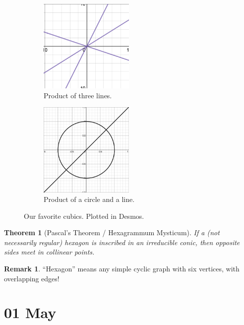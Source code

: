 \documentclass[12pt]{article}
\newtheorem{theorem}{Theorem}[section]
\theoremstyle{definition}
\newtheorem*{remark}{Remark}
\begin{document}
\begin{figure}[H]
    \vspace{1 cm}
    \begin{subfigure}{0.5\textwidth}
        \centering
        \includegraphics[width=0.5\textwidth]{44.png}
        \caption{Product of three lines.}
        \label{fig:subim2}
    \end{subfigure}
    \hfill
    \begin{subfigure}{0.5\textwidth}
        \centering
        \includegraphics[width=0.5\textwidth]{45.png}
        \caption{Product of a circle and a line.}
        \label{fig:subim2}
    \end{subfigure}

    \caption{Our favorite cubics. Plotted in Desmos.}
\end{figure}
\begin{theorem}[Pascal's Theorem / Hexagrammum Mysticum]
    If a (not necessarily regular) hexagon is inscribed in an irreducible conic, then opposite sides meet in collinear points.
\end{theorem}
\begin{remark}
   ``Hexagon'' means any simple cyclic graph with six vertices, with overlapping edges!
\end{remark}
\section{01 May}
\end{document}
